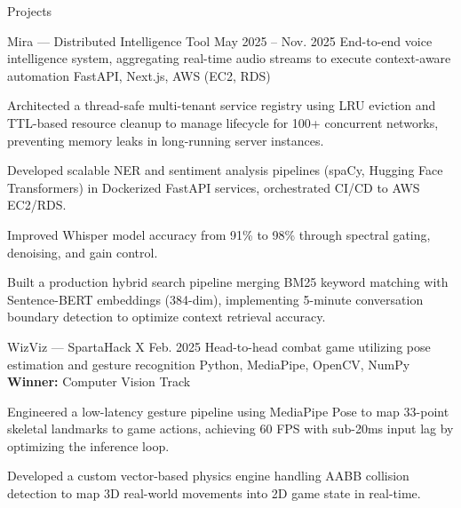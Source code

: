 \documentclass[
	11pt
]{../resume}
\begin{document}
	\begin{rSection}{P}{rojects}

		\begin{rSectionEntry}
			{Mira --- Distributed Intelligence Tool}
			{May 2025 -- Nov. 2025}
			{End-to-end voice intelligence system, aggregating real-time audio streams to execute context-aware automation}
			{FastAPI, Next.js, AWS (EC2, RDS)}
			{}

			\item Architected a thread-safe multi-tenant service registry using LRU eviction and TTL-based resource cleanup to manage lifecycle for 100+ concurrent networks, preventing memory leaks in long-running server instances.
			\item Developed scalable NER and sentiment analysis pipelines (spaCy, Hugging Face Transformers) in Dockerized FastAPI services, orchestrated CI/CD to AWS EC2/RDS.
			\item Improved Whisper model accuracy from 91\% to 98\% through spectral gating, denoising, and gain control.
			\item Built a production hybrid search pipeline merging BM25 keyword matching with Sentence-BERT embeddings (384-dim), implementing 5-minute conversation boundary detection to optimize context retrieval accuracy.
		\end{rSectionEntry}

		\begin{rSectionEntry}
			{WizViz --- SpartaHack X}
			{Feb. 2025}
			{Head-to-head combat game utilizing pose estimation and gesture recognition}
			{Python, MediaPipe, OpenCV, NumPy}
			{\textbf{Winner:} Computer Vision Track}

			\item Engineered a low-latency gesture pipeline using MediaPipe Pose to map 33-point skeletal landmarks to game actions, achieving 60 FPS with sub-20ms input lag by optimizing the inference loop.
			\item Developed a custom vector-based physics engine handling AABB collision detection to map 3D real-world movements into 2D game state in real-time.
		\end{rSectionEntry}
	\end{rSection}
\end{document}
